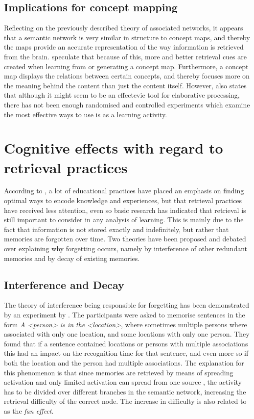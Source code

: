 \subsection{Implications for concept mapping}

Reflecting on the previously described theory of associated networks, it appears that a semantic network is very similar in structure to concept maps, and thereby the maps provide an accurate representation of the way information is retrieved from the brain.  speculate that because of this, more and better retrieval cues are created when learning from or generating a concept map. Furthermore, a concept map displays the relations between certain concepts, and thereby focuses more on the meaning behind the content than just the content itself. However,  also states that although it might seem to be an effectevie tool for elaborative processing, there has not been enough randomised and controlled experiments which examine the most effective ways to use is as a learning activity.

\section{Cognitive effects with regard to retrieval practices}

According to , a lot of educational practices have placed an emphasis on finding optimal ways to encode knowledge and experiences, but that retrieval practices have received less attention, even so basic research has indicated that retrieval is still important to consider in any analysis of learning. This is mainly due to the fact that information is not stored exactly and indefinitely, but rather that memories are forgotten over time. Two theories have been proposed and debated over explaining why forgetting occurs, namely by interference of other redundant memories and by decay of existing memories.

\subsection{Interference and Decay}

The theory of interference being responsible for forgetting has been demonstrated by an experiment by . The participants were asked to memorise sentences in the form \emph{A \textless person\textgreater{} is in the \textless location\textgreater}, where sometimes multiple persons where associated with only one location, and some locations with only one person. They found that if a sentence contained locations or persons with multiple associations this had an impact on the recognition time for that sentence, and even more so if both the location and the person had multiple associations. The explanation for this phenomenon is that since memories are retrieved by means of spreading activation and only limited activation can spread from one source \cite{cognitivepsychology}, the activity has to be divided over different branches in the semantic network, increasing the retrieval difficulty of the correct node. The increase in difficulty is also related to as the \emph{fan effect}.

